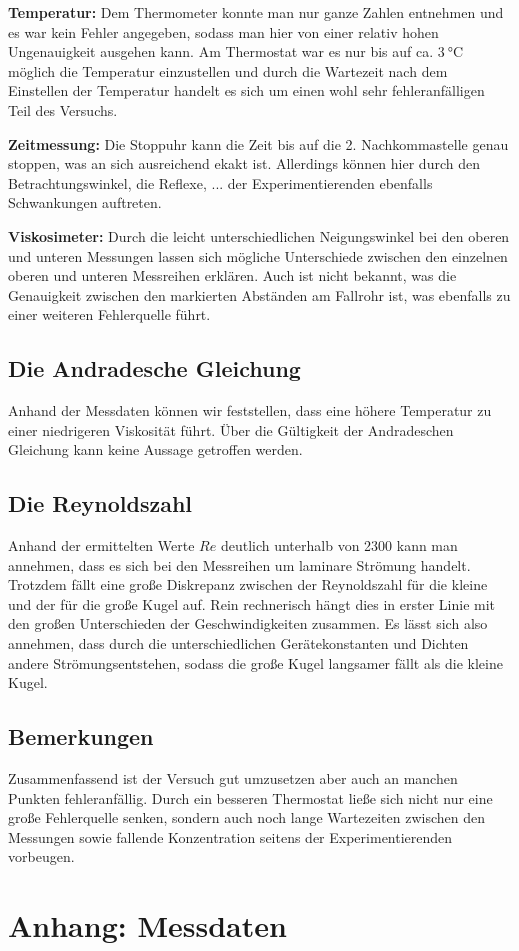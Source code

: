 \textbf{Temperatur:}
Dem Thermometer konnte man nur ganze Zahlen entnehmen und es war kein Fehler angegeben, sodass man hier von einer relativ hohen Ungenauigkeit ausgehen kann.
Am Thermostat war es nur bis auf ca. $\qty{3}{\degreeCelsius}$ möglich die Temperatur einzustellen und durch die Wartezeit nach dem Einstellen der Temperatur
handelt es sich um einen wohl sehr fehleranfälligen Teil des Versuchs.

\textbf{Zeitmessung:}
Die Stoppuhr kann die Zeit bis auf die 2. Nachkommastelle genau stoppen, was an sich ausreichend ekakt ist.
Allerdings können hier durch den Betrachtungswinkel, die Reflexe, ... der Experimentierenden ebenfalls Schwankungen auftreten.

\textbf{Viskosimeter:}
Durch die leicht unterschiedlichen Neigungswinkel bei den oberen und unteren Messungen lassen sich mögliche Unterschiede zwischen den einzelnen oberen und
unteren Messreihen erklären.
Auch ist nicht bekannt, was die Genauigkeit zwischen den markierten Abständen am Fallrohr ist, was ebenfalls zu einer weiteren Fehlerquelle führt.


\subsection[]{Die Andradesche Gleichung}
Anhand der Messdaten können wir feststellen, dass eine höhere Temperatur zu einer niedrigeren Viskosität führt.
Über die Gültigkeit der Andradeschen Gleichung kann keine Aussage getroffen werden.

\subsection[]{Die Reynoldszahl}
Anhand der ermittelten Werte $Re$ deutlich unterhalb von 2300 kann man annehmen, dass es sich bei den Messreihen um laminare Strömung handelt.
Trotzdem fällt eine große Diskrepanz zwischen der Reynoldszahl für die kleine und der für die große Kugel auf.
Rein rechnerisch hängt dies in erster Linie mit den großen Unterschieden der Geschwindigkeiten zusammen.
Es lässt sich also annehmen, dass durch die unterschiedlichen Gerätekonstanten und Dichten andere Strömungsentstehen, sodass 
die große Kugel langsamer fällt als die kleine Kugel.

\subsection[]{Bemerkungen}
Zusammenfassend ist der Versuch gut umzusetzen aber auch an manchen Punkten fehleranfällig.
Durch ein besseren Thermostat ließe sich nicht nur eine große Fehlerquelle senken,
sondern auch noch lange Wartezeiten zwischen den Messungen sowie fallende Konzentration seitens der Experimentierenden vorbeugen.



\section*{Anhang: Messdaten}

\printbibliography

